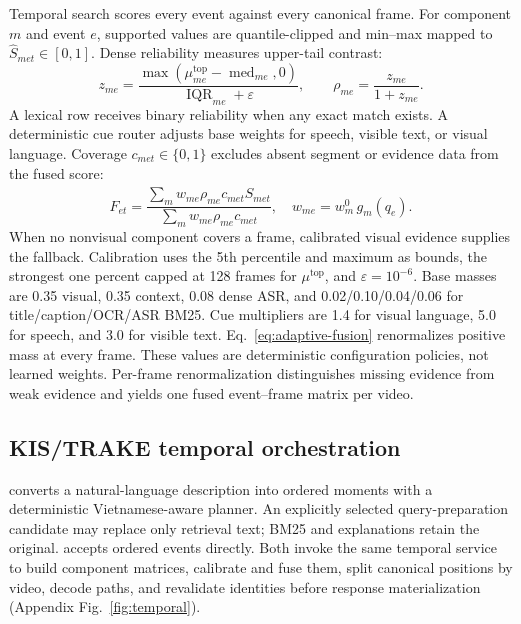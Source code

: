 Temporal search scores every event against every canonical frame. For
component $m$ and event $e$, supported values are quantile-clipped and min--max
mapped to $\widehat{S}_{met}\in[0,1]$. Dense reliability measures upper-tail
contrast:
\begin{equation}
 z_{me}=\frac{\max(\mu^{\mathrm{top}}_{me}-\operatorname{med}_{me},0)}
 {\operatorname{IQR}_{me}+\varepsilon},\qquad
 \rho_{me}=\frac{z_{me}}{1+z_{me}}.
 \label{eq:reliability}
\end{equation}
A lexical row receives binary reliability when any exact match exists. A
deterministic cue router adjusts base weights for speech, visible text, or visual
language. Coverage $c_{met}\in\{0,1\}$ excludes absent segment or evidence data
from the fused score:
\begin{equation}
 F_{et}=\frac{\sum_m w_{me}\rho_{me}c_{met}\widehat{S}_{met}}
                   {\sum_m w_{me}\rho_{me}c_{met}},
 \quad w_{me}=w_m^{0}\,g_m(q_e).
 \label{eq:adaptive-fusion}
\end{equation}
When no nonvisual component covers a frame, calibrated visual evidence supplies
the fallback. Calibration uses the 5th percentile and maximum as bounds, the
strongest one percent capped at 128 frames for $\mu^{\mathrm{top}}$, and
$\varepsilon=10^{-6}$. Base masses are 0.35 visual, 0.35 context, 0.08 dense ASR,
and 0.02/0.10/0.04/0.06 for title/caption/OCR/ASR BM25. Cue multipliers are 1.4
for visual language, 5.0 for speech, and 3.0 for visible text.
Eq.~\ref{eq:adaptive-fusion} renormalizes positive mass at every frame. These
values are deterministic configuration policies, not learned weights. Per-frame
renormalization distinguishes missing evidence from weak evidence and yields one
fused event--frame matrix per video.

\subsection{KIS/TRAKE temporal orchestration}

\KIS{} converts a natural-language description into ordered moments with a
deterministic Vietnamese-aware planner. An explicitly selected query-preparation
candidate may replace only retrieval text; BM25 and explanations retain the
original. \TRAKE{} accepts ordered events directly. Both invoke the same temporal
service to build component matrices, calibrate and fuse them, split canonical
positions by video, decode paths, and revalidate identities before response
materialization (Appendix Fig.~\ref{fig:temporal}).

